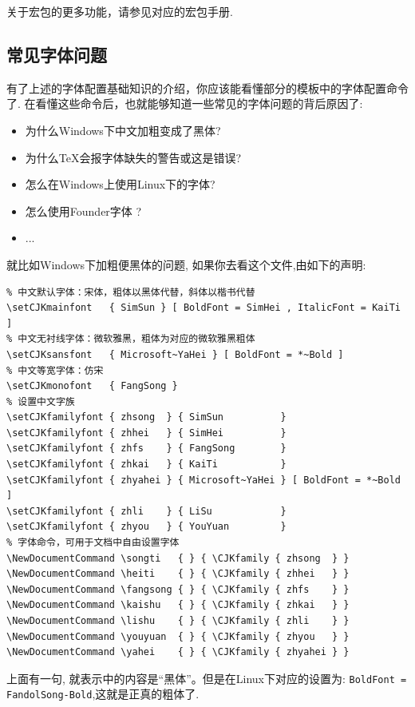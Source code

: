 关于宏包的更多功能，请参见对应的宏包手册. 


\subsection{常见字体问题}
有了上述的字体配置基础知识的介绍，你应该能看懂部分的模板中的字体配置命令了. 在看懂这些命令后，也就能够知道一些常见的字体问题的背后原因了:
\begin{itemize}
    \item 为什么Windows下中文加粗变成了黑体?
    \item 为什么\TeX{}会报字体缺失的警告或这是错误?
    \item 怎么在Windows上使用Linux下的字体?
    \item 怎么使用Founder字体 ?
    \item ...
\end{itemize}

就比如Windows下加粗便黑体的问题,
如果你去看这个文件,由如下的声明:
\begin{verbatim}
% 中文默认字体：宋体，粗体以黑体代替，斜体以楷书代替
\setCJKmainfont   { SimSun } [ BoldFont = SimHei , ItalicFont = KaiTi ]
% 中文无衬线字体：微软雅黑，粗体为对应的微软雅黑粗体
\setCJKsansfont   { Microsoft~YaHei } [ BoldFont = *~Bold ]
% 中文等宽字体：仿宋
\setCJKmonofont   { FangSong }
% 设置中文字族
\setCJKfamilyfont { zhsong  } { SimSun          }
\setCJKfamilyfont { zhhei   } { SimHei          }
\setCJKfamilyfont { zhfs    } { FangSong        }
\setCJKfamilyfont { zhkai   } { KaiTi           }
\setCJKfamilyfont { zhyahei } { Microsoft~YaHei } [ BoldFont = *~Bold ]
\setCJKfamilyfont { zhli    } { LiSu            }
\setCJKfamilyfont { zhyou   } { YouYuan         }
% 字体命令，可用于文档中自由设置字体
\NewDocumentCommand \songti   { } { \CJKfamily { zhsong  } }
\NewDocumentCommand \heiti    { } { \CJKfamily { zhhei   } }
\NewDocumentCommand \fangsong { } { \CJKfamily { zhfs    } }
\NewDocumentCommand \kaishu   { } { \CJKfamily { zhkai   } }
\NewDocumentCommand \lishu    { } { \CJKfamily { zhli    } }
\NewDocumentCommand \youyuan  { } { \CJKfamily { zhyou   } }
\NewDocumentCommand \yahei    { } { \CJKfamily { zhyahei } }
\end{verbatim}

上面有一句, 就表示中的内容是``黑体''。但是在Linux下对应的设置为:
\texttt{BoldFont = FandolSong-Bold},这就是正真的粗体了.

